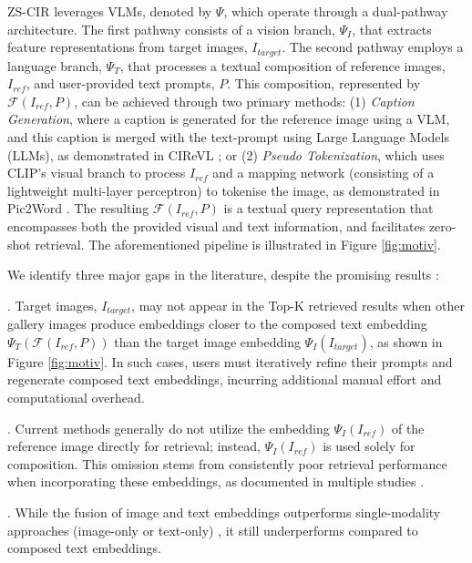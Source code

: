 ZS-CIR leverages VLMs, denoted by $\Psi$, which operate through a dual-pathway architecture. The first pathway consists of a vision branch, $\Psi_I$, that extracts feature representations from target images, $I_{target}$. The second pathway employs a language branch, $\Psi_T$, that processes a textual composition of reference images, $I_{ref}$, and user-provided text prompts, $P$. This composition, represented by $\mathcal{F}(I_{ref}, P)$, can be achieved through two primary methods: (1) \textit{Caption Generation}, where a caption is generated for the reference image using a VLM, and this caption is merged with the text-prompt using Large Language Models (LLMs), as demonstrated in CIReVL \cite{karthik2024visionbylanguage}; or (2) \textit{Pseudo Tokenization}, which uses CLIP's \cite{radford2021learning} visual branch to process $I_{ref}$ and a mapping network (consisting of a lightweight multi-layer perceptron) to tokenise the image, as demonstrated in Pic2Word \cite{saito2023pic2word}. The resulting $\mathcal{F}(I_{ref},P)$ is a textual query representation that encompasses both the provided visual and text information, and facilitates zero-shot retrieval.
The aforementioned pipeline is illustrated in Figure \ref{fig:motiv}. 

We identify three major gaps in the literature, despite the promising results \cite{saito2023pic2word,karthik2024visionbylanguage,gu2024lincir,baldrati2023zero}:

. Target images, $I_{target}$, may not appear in the Top-K retrieved results when other gallery images produce embeddings closer to the composed text embedding $\Psi_{T}(\mathcal{F}(I_{ref},P))$ than the target image embedding $\Psi_{I}(I_{target})$, as shown in Figure \ref{fig:motiv}. In such cases, users must iteratively refine their prompts and regenerate composed text embeddings, incurring additional manual effort and computational overhead.
    
. Current methods generally do not utilize the embedding $\Psi_{I}(I_{ref})$ of the reference image directly for retrieval; instead, $\Psi_{I}(I_{ref})$ is used solely for composition. This omission stems from consistently poor retrieval performance when incorporating these embeddings, as documented in multiple studies \cite{saito2023pic2word,karthik2024visionbylanguage,baldrati2023zero}.

. While the fusion of image and text embeddings outperforms single-modality approaches (image-only or text-only) \cite{saito2023pic2word,karthik2024visionbylanguage,baldrati2023zero}, it still underperforms compared to composed text embeddings.


